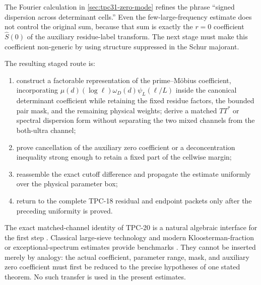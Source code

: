 The Fourier calculation in \cref{sec:tpc31-zero-mode} refines the
phrase ``signed dispersion across determinant cells.''  Even the
few-large-frequency estimate does not control the original sum,
because that sum is exactly the $r=0$ coefficient $\widehat S(0)$ of
the auxiliary residue-label transform.  The next stage must make this
coefficient non-generic by using structure suppressed in the Schur
majorant.

The resulting staged route is:
\begin{enumerate}[label={\textup{TPC-\arabic*:}},start=32]
 \item construct a factorable representation of the prime--M\"obius
 coefficient, incorporating
 $\mu(d)(\log\ell)\omega_D(d)\psi_L(\ell/L)$ inside the canonical
 determinant coefficient while retaining the fixed residue factors,
 the bounded pair mask, and the remaining physical weights; derive a
 matched $TT^*$ or spectral dispersion form without separating the two
 mixed channels from the both-ultra channel;
 \item prove cancellation of the auxiliary zero coefficient or a deconcentration inequality
 strong enough to retain a fixed part of the cellwise margin;
 \item reassemble the exact cutoff difference and propagate the
 estimate uniformly over the physical parameter box;
 \item return to the complete TPC-18 residual and endpoint packets
 only after the preceding uniformity is proved.
\end{enumerate}

The exact matched-channel identity of TPC-20 is a natural algebraic
interface for the first step \citep{WangTPC20}.  Classical large-sieve
technology and modern Kloosterman-fraction or exceptional-spectrum
estimates provide benchmarks
\citep{IwaniecKowalski2004,DukeFriedlanderIwaniec1997,
BettinChandee2018,Pascadi2026LargeSieve}.  They cannot be inserted
merely by analogy: the actual coefficient, parameter range, mask, and
auxiliary zero coefficient must first be reduced to the precise
hypotheses of one stated theorem.  No such transfer is used in the
present estimates.

